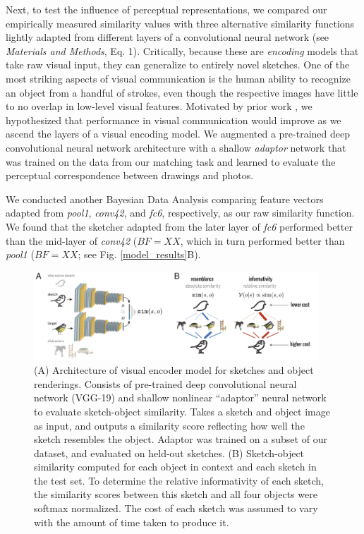 \documentclass[9pt,twocolumn,twoside]{pnas-new}
\begin{document}
Next, to test the influence of perceptual representations, we compared our empirically measured similarity values with three alternative similarity functions lightly adapted from different layers of a convolutional neural network (see \emph{Materials and Methods}, Eq. 1). Critically, because these are \emph{encoding} models that take raw visual input, they can generalize to entirely novel sketches. One of the most striking aspects of visual communication is the human ability to recognize an object from a handful of strokes, even though the respective images have little to no overlap in low-level visual features. Motivated by prior work \cite{FanCommon2018}, we hypothesized that performance in visual communication would improve as we ascend the layers of a visual encoding model.  We augmented a pre-trained deep convolutional neural network architecture with a shallow \emph{adaptor} network that was trained on the data from our matching task and learned to evaluate the perceptual correspondence between drawings and photos. 

We conducted another Bayesian Data Analysis comparing feature vectors adapted from \emph{pool1}, \emph{conv42}, and \emph{fc6}, respectively, as our raw similarity function. We found that the sketcher adapted from the later layer of \emph{fc6} performed better than the mid-layer of \emph{conv42} ($BF= XX$, which in turn performed better than \emph{pool1} ($BF = XX$; see Fig. \ref{model_results}B).

\begin{figure}[htbp]
\centering
\includegraphics[width=0.95\textwidth]{figures/4_model_schematic.pdf}
\caption{(A) Architecture of visual encoder model for sketches and object renderings. Consists of pre-trained deep convolutional neural network (VGG-19) and shallow nonlinear ``adaptor'' neural network to evaluate sketch-object similarity. Takes a sketch and object image as input, and outputs a similarity score reflecting how well the sketch resembles the object. Adaptor was trained on a subset of our dataset, and evaluated on held-out sketches. (B) Sketch-object similarity computed for each object in context and each sketch in the test set. To determine the relative informativity of each sketch, the similarity scores between this sketch and all four objects were softmax normalized. The cost of each sketch was assumed to vary with the amount of time taken to produce it.}
\label{model_schematic}
\end{figure}
\end{document}
